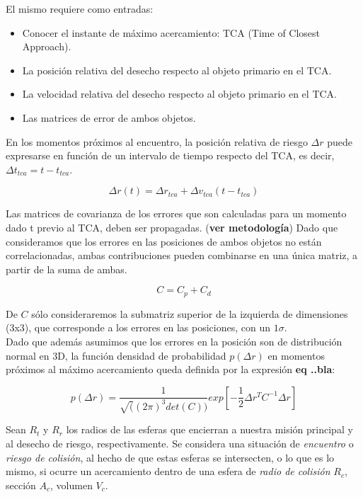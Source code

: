 El mismo requiere como entradas:
\begin{itemize}
 \item Conocer el instante de m\'aximo acercamiento: TCA (Time of Closest Approach).
 \item La posici\'on relativa del desecho respecto al objeto primario en el TCA.
 \item La velocidad relativa del desecho respecto al objeto primario en el TCA.
 \item Las matrices de error de ambos objetos.
\end{itemize}

En los momentos pr\'oximos al encuentro, la posici\'on relativa de riesgo $\Delta r$ puede expresarse en funci\'on de un intervalo de tiempo respecto del TCA, es decir, $\Delta t_{tca}=t-t_{tca}$.

\begin{equation}
 \Delta r(t)=\Delta r_{tca}+\Delta v_{tca}(t-t_{tca})
\end{equation}

Las matrices de covarianza de los errores que son calculadas para un momento dado t previo al TCA, deben ser propagadas. ({\bf{ver metodolog\'ia}})
Dado que consideramos que los errores en las posiciones de ambos objetos no est\'an correlacionadas, ambas contribuciones pueden combinarse en una \'unica matriz, a partir de la suma de ambas.

\begin{equation}
 C=C_{p}+C_{d}
\end{equation}

De $C$ s\'olo consideraremos la submatriz superior de la izquierda de dimensiones (3x3), que corresponde a los errores en las posiciones, con un $1 \sigma$.\\
Dado que adem\'as asumimos que los errores en la posici\'on son de distribuci\'on normal en 3D, la funci\'on densidad de probabilidad $p(\Delta r)$ en momentos pr\'oximos al m\'aximo acercamiento queda definida por la expresi\'on {\bf{eq ..bla}}:

\begin{equation}
 p(\Delta r)=\frac{1}{\sqrt((2 \pi)^3det(C))} exp[-\frac{1}{2}\Delta r^TC^{-1}\Delta r] 
\end{equation}



Sean $R_{t}$ y $R_{r}$ los radios de las esferas que encierran a nuestra misi\'on principal y al desecho de riesgo, respectivamente. Se considera una situaci\'on de {\it{encuentro}} o {\it{riesgo de colisi\'on}}, al hecho de que estas esferas se intersecten, o lo que es lo mismo, si ocurre un acercamiento dentro de una esfera de {\it{radio de colisi\'on}} $R_{c}$, secci\'on $A_{c}$,  volumen $V_{c}$.

